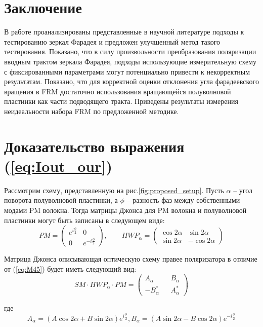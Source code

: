 \documentclass{article}
\begin{document}
\section{Заключение}
В работе проанализированы представленные в научной литературе подходы к тестированию зеркал Фарадея и предложен улучшенный метод такого тестирования.
Показано, что в силу произвольности преобразования поляризации вводным трактом зеркала Фарадея, подходы использующие измерительную схему с фиксированными параметрами могут потенциально привести к некорректным результатам.
Показано, что для корректной оценки отклонения угла фарадеевского вращения в FRM достаточно использования вращающейся полуволновой пластинки как части подводящего тракта.
Приведены результаты измерения неидеальности набора FRM по предложенной методике.

\appendix
{}
\section{Доказательство выражения (\ref{eq:Iout_our})}
Рассмотрим схему, представленную на рис.\ref{fig:proposed_setup}.
Пусть $\alpha$ – угол поворота полуволновой пластинки, а $\phi$ – разность фаз между собственными модами PM волокна.
Тогда матрицы Джонса для PM волокна и полуволновой пластинки могут быть записаны в следующем виде:
\begin{equation}
	PM = 
	\begin{pmatrix}
		e^{i\frac{\phi}{2}} & 0 \\
		0 & e^{-i\frac{\phi}{2}}
	\end{pmatrix},\qquad 
	HWP_\alpha = 
	\begin{pmatrix}
		\cos 2 \alpha & \sin 2 \alpha \\
		\sin 2 \alpha & -\cos 2 \alpha
	\end{pmatrix}
\end{equation}

Матрица Джонса описывающая оптическую схему правее поляризатора в отличие от (\ref{eq:M45}) будет иметь следующий вид:
\begin{equation}
	SM \cdot HWP_\alpha \cdot PM =
	\begin{pmatrix} 
		A_\alpha 	&& 	B_\alpha \\
		-B_\alpha^* && 	A_\alpha^*
	\end{pmatrix}
\end{equation}

где
\begin{equation}
	\label{eq:alpha_def}
	A_\alpha = \left( A\cos2\alpha + B\sin2\alpha\right) e^{i\frac{\phi}{2}},
	B_\alpha = \left( A\sin2\alpha - B\cos2\alpha\right) e^{-i\frac{\phi}{2}}
\end{equation}
\end{document}
